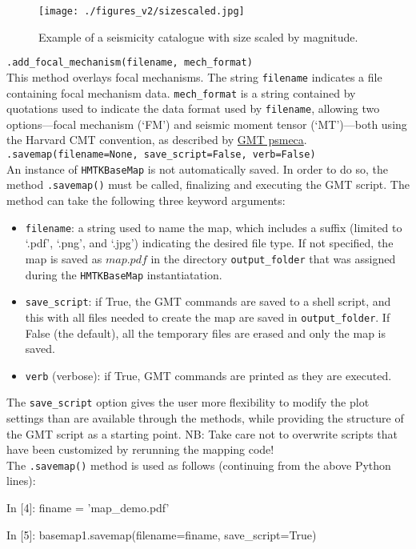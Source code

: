 \begin{figure}[htb]
  \centering
      \texttt{[image: ./figures\_v2/sizescaled.jpg]}
	\caption{Example of a seismicity catalogue with size scaled by magnitude.}
  \label{fig:source_model_map}
\end{figure}

\noindent \verb;.add_focal_mechanism(filename, mech_format);\\

\noindent This method overlays focal mechanisms. The string \verb=filename= indicates a file containing focal mechanism data. \verb=mech_format= is a string contained by quotations used to indicate the data format used by \verb=filename=, allowing two options---focal mechanism (`FM') and seismic moment tensor (`MT')---both using the Harvard CMT convention, as described by \href{https://docs.generic-mapping-tools.org/latest/supplements/seis/psmeca.html?highlight=psmeca\#s}{GMT psmeca}.\\

\noindent \verb;.savemap(filename=None, save_script=False, verb=False);\\

An instance of \verb=HMTKBaseMap= is not automatically saved. In order to do so, the method \verb=.savemap()= must be called, finalizing and executing the GMT script. The method can take the following three keyword arguments:\\

\begin{itemize}
\item \verb=filename=: a string used to name the map, which includes a suffix (limited to `.pdf', `.png', and `.jpg') indicating the desired file type. If not specified, the map is saved as $map.pdf$ in the directory \verb=output_folder= that was assigned during the \verb=HMTKBaseMap= instantiatation.
\item \verb=save_script=: if True, the GMT commands are saved to a shell script, and this with all files needed to create the map are saved in \verb=output_folder=. If False (the default), all the temporary files are erased and only the map is saved.
\item \verb=verb= (verbose): if True, GMT commands are printed as they are executed.\\
\end{itemize}

The \verb=save_script= option gives the user more flexibility to modify the plot settings than are available through the methods, while providing the structure of the GMT script as a starting point. NB: Take care not to overwrite scripts that have been customized by rerunning the mapping code! \\

The \verb=.savemap()= method is used as follows (continuing from the above Python lines):\\

\begin{python}[frame=single]
In [4]: finame = 'map_demo.pdf'

In [5]: basemap1.savemap(filename=finame, save_script=True)
\end{python}

